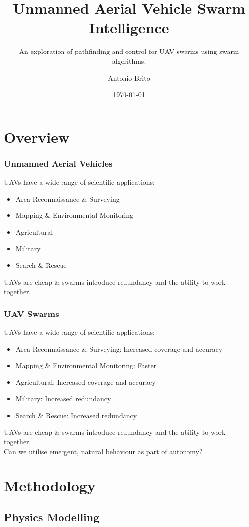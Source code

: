 \documentclass{beamer}
\title{Unmanned Aerial Vehicle Swarm Intelligence}
\subtitle{An exploration of pathfinding and control for UAV swarms using swarm algorithms.}
\author{Antonio Brito}
\institute{University of Warwick}
\date{\today}
\begin{document}
\begin{frame}
    \titlepage
\end{frame}

\section{Overview}

\begin{frame}
    \frametitle{Unmanned Aerial Vehicles}
    UAVs have a wide range of scientific applications:
    \begin{itemize}
        \item Area Reconnaissance \& Surveying
        \item Mapping \& Environmental Monitoring
        \item Agricultural
        \item Military
        \item Search \& Rescue
    \end{itemize}
    
    UAVs are cheap \& swarms introduce redundancy and the ability to work together.
\end{frame}

\begin{frame}
    \frametitle{UAV Swarms}
    UAVs have a wide range of scientific applications:
    \begin{itemize}
        \item Area Reconnaissance \& Surveying: Increased coverage and accuracy
        \item Mapping \& Environmental Monitoring: Faster
        \item Agricultural: Increased coverage and accuracy
        \item Military: Increased redundancy
        \item Search \& Rescue: Increased redundancy
    \end{itemize}
    
    UAVs are cheap \& swarms introduce redundancy and the ability to work together.
    \\
    Can we utilise emergent, natural behaviour as part of autonomy?
\end{frame}

\section{Methodology}
\subsection{Physics Modelling}
\end{document}
